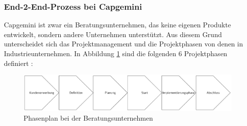 \documentclass[a4paper, 12pt]{scrartcl}
\begin{document}
	\subsubsection{End-2-End-Prozess bei Capgemini}
	Capgemini ist zwar ein Beratungsunternehmen, das keine eigenen Produkte entwickelt, sondern andere Unternehmen unterstützt. Aus diesem Grund unterscheidet sich das Projektmanagement und die Projektphasen von denen in Industrieunternehmen. In Abbildung \ref{Projektmanagment_Campgeini} sind die folgenden 6 Projektphasen definiert \cite{wegmann2006projektmanagement}:
	\begin{figure}[h!]
		\begin{center}
			\includegraphics[width=12cm]{Projektmanagement_Capgemini .png}
			\caption{Phasenplan bei der Beratungsunternehmen \cite{wegmann2006projektmanagement}}
			\label{Projektmanagment_Campgeini}
		\end{center}
	\end{figure}
\end{document}
